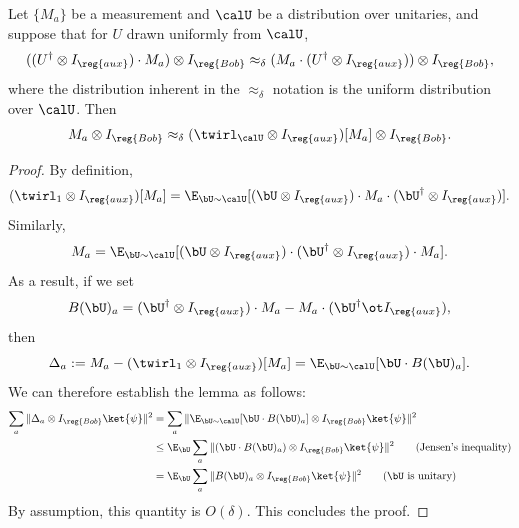   
  \begin{lemma}\label{lem:commute-to-twirlU}
    Let $\{M_{a}\}$ be a measurement and $\calU$ be a distribution over
    unitaries,
    and suppose that for $U$ drawn uniformly from $\calU$,
    \begin{equation*}
      ((U^\dagger \otimes I_{\reg{aux}}) \cdot M_{a}) \otimes I_{\reg{Bob}}
      \approx_{\delta} (M_{a} \cdot (U^\dagger \otimes I_{\reg{aux}})) \otimes I_{\reg{Bob}},
    \end{equation*}
    where the distribution inherent in the $\approx_{\delta}$ notation
    is the uniform distribution over $\calU$.
    Then
    \begin{equation*}
      M_{a} \otimes I_{\reg{Bob}} \approx_{\delta} (\twirl_{\calU} \otimes I_{\reg{aux}})[M_{a}] \otimes I_{\reg{Bob}}.
    \end{equation*}
  \end{lemma}
  
  \begin{proof}
    By definition,
\begin{equation*}
(\twirl_1 \otimes I_{\reg{aux}})[M_{a}]
= \E_{\bU \sim \calU} [(\bU \otimes I_{\reg{aux}}) \cdot M_a \cdot (\bU^\dagger \otimes I_{\reg{aux}})].
\end{equation*}
Similarly,
\begin{equation*}
M_{a}
= \E_{\bU \sim \calU} [( \bU \otimes I_{\reg{aux}}) \cdot
(\bU^\dagger \otimes I_{\reg{aux}})  \cdot M_a].
\end{equation*}
As a result, if we set
\begin{equation*}
B(\bU)_a = (\bU^\dagger \otimes I_{\reg{aux}}) \cdot M_a - M_a \cdot (\bU^\dagger \ot I_{\reg{aux}}),
\end{equation*}
then
\begin{equation*}
\Delta_a:=
M_a - (\twirl_1 \otimes I_{\reg{aux}})[M_a]
= \E_{\bU \sim \calU} [\bU \cdot B(\bU)_a ].
\end{equation*}
We can therefore establish the lemma as follows:
\begin{align*}
\sum_a \Vert \Delta_a \otimes I_{\reg{Bob}} \ket{\psi} \Vert^2
& = \sum_a \Vert \E_{\bU \sim \calU} [ \bU \cdot B(\bU)_a ] \otimes I_{\reg{Bob}} \ket{\psi} \Vert^2\\
& \leq \E_{\bU} \sum_a \Vert (\bU \cdot B(\bU)_a ) \otimes I_{\reg{Bob}} \ket{\psi} \Vert^2\tag{Jensen's inequality}\\
& = \E_{\bU} \sum_a \Vert B(\bU)_a \otimes I_{\reg{Bob}} \ket{\psi} \Vert^2 \tag{$\bU$ is unitary}
\end{align*}
By assumption, this quantity is $O(\delta)$. This concludes the proof.
\end{proof}

